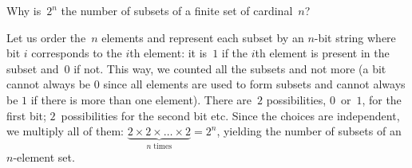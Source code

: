 \label{state_explosion}
Why is~\(2^n\) the number of subsets of a finite set of
cardinal~\(n\)?

Let us order the~\(n\) elements and represent each subset by an
\(n\)-bit string where bit \(i\) corresponds to the \(i\)th element:
it is~\(1\) if the \(i\)th element is present in the subset and~\(0\)
if not. This way, we counted all the subsets and not more (a bit
cannot always be \(0\) since all elements are used to form subsets and
cannot always be \(1\) if there is more than one element). There
are~\(2\) possibilities, \(0\)~or~\(1\), for the first bit;
\(2\)~possibilities for the second bit etc. Since the choices are
independent, we multiply all of them: \(\underbrace{2 \times 2 \times
  \dots \times 2}_{n \; \text{times}} = 2^n\), yielding the number of
subsets of an \(n\)-element set.

